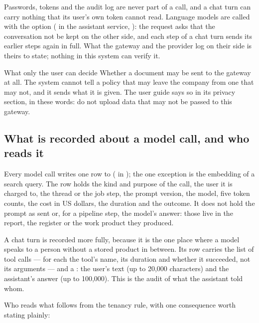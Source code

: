 Passwords, tokens and the audit log are never part of a call, and a chat turn can carry
nothing that its user's own token cannot read. Language models are called
with the option   ( in the assistant service,
): the request asks that the conversation not be kept on the other
side, and each step of a chat turn sends its earlier steps again in full. What the gateway and
the provider log on their side is theirs to state; nothing in this system can verify it.

\begin{humanbox}{What only the user can decide}
Whether a document may be sent to the gateway at all. The system cannot tell a policy that
may leave the company from one that may not, and it sends what it is given. The user guide
says so in its privacy section, in these words: do not upload data that may not be passed to
this gateway.
\end{humanbox}

\subsection{What is recorded about a model call, and who reads it}\label{sec:security:ai:logged}

Every model call writes one row to  ( in
); the one exception is the embedding of a search query. The row
holds the kind and purpose of the call, the user it is charged to, the thread or the job
step, the prompt version, the model, five token counts, the cost in US dollars, the duration
and the outcome. It does not hold the prompt as sent or, for a pipeline step, the model's
answer: those live in the report, the register or the work product they produced.

A chat turn is recorded more fully, because it is the one place where a model speaks to a
person without a stored product in between. Its row carries the list of tool calls --- for
each the tool's name, its duration and whether it succeeded, not its arguments --- and a
: the user's text (up to 20,000 characters) and the assistant's answer (up
to 100,000). This is the audit of what the assistant told whom.

Who reads what follows from the tenancy rule, with one consequence worth stating plainly:

